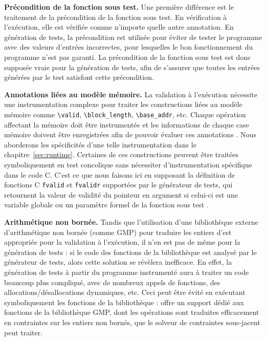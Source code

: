 \textbf{Précondition de la fonction sous test.}
Une première différence est le traitement de la précondition de la fonction sous
test.
En vérification à l'exécution, elle est vérifiée comme n'importe quelle autre
annotation.
En génération de tests, la précondition est utilisée pour éviter de tester le
programme avec des valeurs d'entrées incorrectes, pour lesquelles le bon
fonctionnement du programme n'est pas garanti.
La précondition de la fonction sous test est donc supposée vraie pour la
génération de tests, afin de s'assurer que toutes les entrées générées par le
test satisfont cette précondition.

\textbf{Annotations liées au modèle mémoire.}
La validation à l'exécution nécessite une instrumentation complexe pour traiter
les constructions \eacsl liées au modèle mémoire comme \lstinline'\valid',
\lstinline'\block_length', \lstinline'\base_addr', etc.
Chaque opération affectant la mémoire doit être instrumentée et les informations
de chaque case mémoire doivent être enregistrées afin de pouvoir évaluer ces
annotations \cite{Kosmatov/RV13}.
Nous aborderons les spécificités d'une telle instrumentation dans le
chapitre~\ref{sec:runtime}.
Certaines de ces constructions peuvent être traitées symboliquement en test
concolique sans nécessiter d'instrumentation spécifique dans le code C.
C'est ce que nous faisons ici en supposant la définition de fonctions C
\lstinline'fvalid' et \lstinline'fvalidr' supportées par le générateur de tests,
qui retournent la valeur de validité du pointeur en argument si celui-ci est
une variable globale ou un paramètre formel de la fonction sous test
\cite{Chebaro/ICSSEA12}.

\textbf{Arithmétique non bornée.}
Tandis que l'utilisation d'une bibliothèque externe d'arithmétique non bornée
(comme GMP) pour traduire les entiers d'\eacsl est appropriée pour la validation
à l'exécution, il n'en est pas de même pour la génération de tests :
si le code des fonctions de la bibliothèque est analysé par le
générateur de tests, alors cette solution se révèlera inefficace.
En effet, la génération de tests à partir du programme instrumenté aura à
traiter un code beaucoup plus compliqué, avec de nombreux appels de fonctions, 
des allocations/désallocations dynamiques, etc.
Ceci peut être évité en exécutant symboliquement les fonctions de la
bibliothèque : \pathcrawler offre un support dédié aux fonctions de la
bibliothèque GMP, dont les opérations sont traduites efficacement en contraintes
sur les entiers non bornés, que le solveur de contraintes sous-jacent peut
traiter.

